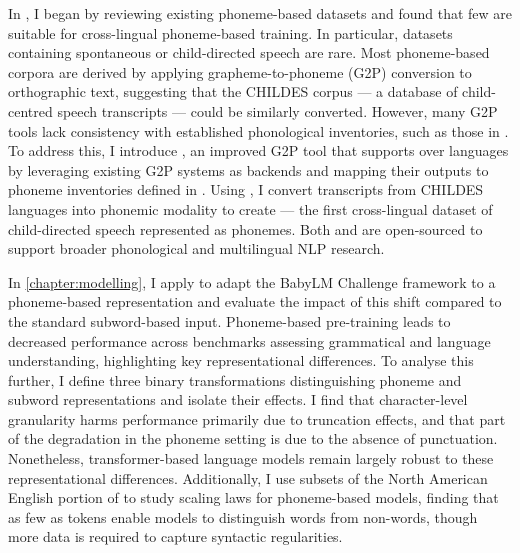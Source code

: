 In , I began by reviewing existing phoneme-based datasets and found that few are suitable for cross-lingual phoneme-based training. In particular, datasets containing spontaneous or child-directed speech are rare. Most phoneme-based corpora are derived by applying grapheme-to-phoneme (G2P) conversion to orthographic text, suggesting that the CHILDES corpus --- a database of child-centred speech transcripts --- could be similarly converted. However, many G2P tools lack consistency with established phonological inventories, such as those in \phoible. To address this, I introduce \gpp, an improved G2P tool that supports over  languages by leveraging existing G2P systems as backends and mapping their outputs to phoneme inventories defined in \phoible. Using \gpp, I convert transcripts from  CHILDES languages into phonemic modality to create \ipachildes --- the first cross-lingual dataset of child-directed speech represented as phonemes. Both \gpp and \ipachildes are open-sourced to support broader phonological and multilingual NLP research.

In \cref{chapter:modelling}, I apply \gpp to adapt the BabyLM Challenge framework to a phoneme-based representation and evaluate the impact of this shift compared to the standard subword-based input. Phoneme-based pre-training leads to decreased performance across benchmarks assessing grammatical and language understanding, highlighting key representational differences. To analyse this further, I define three binary transformations distinguishing phoneme and subword representations and isolate their effects. I find that character-level granularity harms performance primarily due to truncation effects, and that part of the degradation in the phoneme setting is due to the absence of punctuation. Nonetheless, transformer-based language models remain largely robust to these representational differences. Additionally, I use subsets of the North American English portion of \ipachildes to study scaling laws for phoneme-based models, finding that as few as  tokens enable models to distinguish words from non-words, though more data is required to capture syntactic regularities.


